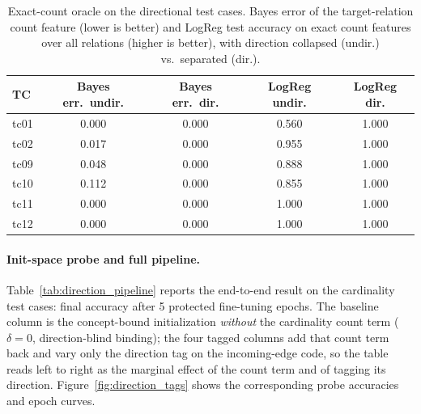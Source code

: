 \documentclass[a4paper,oneside,bibliography=totoc]{scrbook}
\begin{document}
\begin{table}[t]
\centering
\small
\caption{Exact-count oracle on the directional test cases. Bayes error of the
target-relation count feature (lower is better) and LogReg test accuracy on
exact count features over all relations (higher is better), with direction
collapsed (undir.) vs.\ separated (dir.).}
\label{tab:direction_oracle}
\begin{tabular}{lcccc}
\toprule
\textbf{TC} & \textbf{Bayes err.\ undir.} & \textbf{Bayes err.\ dir.} & \textbf{LogReg undir.} & \textbf{LogReg dir.} \\
\midrule
tc01 & 0.000 & 0.000 & 0.560 & 1.000 \\
tc02 & 0.017 & 0.000 & 0.955 & 1.000 \\
tc09 & 0.048 & 0.000 & 0.888 & 1.000 \\
tc10 & 0.112 & 0.000 & 0.855 & 1.000 \\
tc11 & 0.000 & 0.000 & 1.000 & 1.000 \\
tc12 & 0.000 & 0.000 & 1.000 & 1.000 \\
\bottomrule
\end{tabular}
\end{table}

\paragraph{Init-space probe and full pipeline.}
Table~\ref{tab:direction_pipeline} reports the end-to-end result on the
cardinality test cases: final accuracy after 5 protected fine-tuning epochs.
The baseline column is the concept-bound initialization \emph{without} the
cardinality count term ($\delta{=}0$, direction-blind binding); the four tagged
columns add that count term back and vary only the direction tag on the
incoming-edge code, so the table reads left to right as the marginal effect of
the count term and of tagging its direction.
Figure~\ref{fig:direction_tags} shows the corresponding probe accuracies and
epoch curves.
\end{document}
